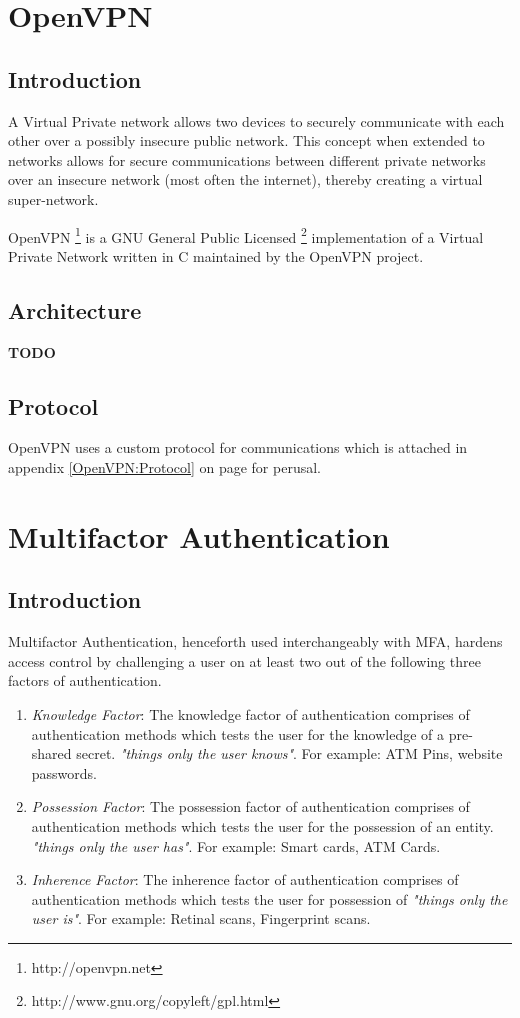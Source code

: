 \documentclass[11pt,oneside]{book}
\begin{document}
\mainmatter

\chapter{OpenVPN}
\section{Introduction}
A Virtual Private network allows two devices to securely communicate with each other
over a possibly insecure public network. This concept when extended to networks
allows for secure communications between different private networks over an
insecure network (most often the internet), thereby creating a virtual super-network.

OpenVPN \footnote{http://openvpn.net} is a GNU General Public
Licensed \footnote{http://www.gnu.org/copyleft/gpl.html} implementation of a
Virtual Private Network written in C maintained by the OpenVPN project.

\section{Architecture}
\textbf{TODO}

\section{Protocol}
OpenVPN uses a custom protocol for communications which is attached in appendix
\ref{OpenVPN:Protocol} on page \pageref{OpenVPN:Protocol} for perusal.

\chapter{Multifactor Authentication}
\section{Introduction}
\label{MFA:Introduction}
Multifactor Authentication, henceforth used interchangeably with MFA, hardens access control
by challenging a user on at least two out of the following three factors of authentication.

\begin{enumerate}
    \item \emph{Knowledge Factor}: The knowledge factor of authentication comprises of
        authentication methods which tests the user for the knowledge of a pre-shared secret.
        \emph{"things only the user knows"}. For example: ATM Pins, website passwords.
    \item \emph{Possession Factor}: The possession factor of authentication comprises of
        authentication methods which tests the user for the possession of an entity.
        \emph{"things only the user has"}. For example: Smart cards, ATM Cards.
    \item \emph{Inherence Factor}: The inherence factor of authentication comprises of
        authentication methods which tests the user for possession of \emph{"things only
        the user is"}. For example: Retinal scans, Fingerprint scans.
\end{enumerate}
\end{document}
